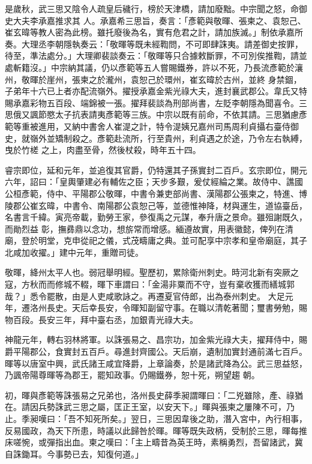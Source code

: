 \begin{pinyinscope}
 是歲秋，武三思又陰令人疏皇后穢行，榜於天津橋，請加廢黜。中宗聞之怒，命御史大夫李承嘉推求其
 人。承嘉希三思旨，奏言：「彥範與敬暉、張柬之、袁恕己、崔玄暐等教人密為此榜。雖托廢後為名，實有危君之計，請加族滅。」制依承嘉所奏。大理丞李朝隱執奏云：「敬暉等既未經鞫問，不可即肆誅夷。請差御史按罪，待至，準法處分。」大理卿裴談奏云：「敬暉等只合據敕斷罪，不可別俟推鞫，請並處斬籍沒。」中宗納其議，仍以彥範等五人嘗賜鐵券，許以不死，乃長流彥範於瀼州，敬暉於崖州，張柬之於瀧州，袁恕己於環州，崔玄暐於古州，並終
 身禁錮，子弟年十六已上者亦配流嶺外。擢授承嘉金紫光祿大夫，進封襄武郡公。韋氏又特賜承嘉彩物五百段、端錦被一張。擢拜裴談為刑部尚書，左貶李朝隱為聞喜令。三思俄又諷節愍太子抗表請夷彥範等三族。中宗以既有前命，不依其請。三思猶慮彥範等重被進用，又納中書舍人崔湜之計，特令湜姨兄嘉州司馬周利貞攝右臺侍御史，就嶺外並矯制殺之。彥範赴流所，行至貴州，利貞遇之於途，乃令左右執縛，曳於竹槎
 之上，肉盡至骨，然後杖殺，時年五十四。



 睿宗即位，延和元年，並追復其官爵，仍特還其子孫實封二百戶。玄宗即位，開元六年，詔曰：「皇輿肇建必有輔佐之臣；天步多艱，爰仗經綸之業。故侍中、譙國公桓彥範，侍中、平陽郡公敬暉，中書令兼吏部尚書、漢陽郡公張柬之，特進、博陵郡公崔玄暐，中書令、南陽郡公袁恕己等，並德惟神降，材與運生，道協臺岳，名書言千緯。寅亮帝載，勤勞王家，參復禹之元謀，奉升唐之景命。雖殂謝既久，而勛烈益
 彰，撫彞鼎以念功，想旂常而增感。緬遵故實，用表徽懿，俾列在清廟，登於明堂，克申從祀之儀，式茂疇庸之典。並可配享中宗孝和皇帝廟庭，其子北咸加收擢。」建中元年，重贈司徒。



 敬暉，絳州太平人也。弱冠舉明經。聖歷初，累除衛州刺史。時河北新有突厥之寇，方秋而而修城不輟，暉下車謂曰：「金湯非粟而不守，豈有棄收獲而繕城郭哉？」悉令罷散，由是人吏咸歌詠之。再遷夏官侍郎，出為泰州刺史。
 大足元年，遷洛州長史。天后幸長安，令暉知副留守事。在職以清乾著聞；璽書勞勉，賜物百段。長安三年，拜中臺右丞，加銀青光祿大夫。



 神龍元年，轉右羽林將軍。以誅張易之、昌宗功，加金紫光祿大夫，擢拜侍中，賜爵平陽郡公，食實封五百戶。尋進封齊國公。天后崩，遺制加實封通前滿七百戶。暉等以唐室中興，武氏諸王咸宜降爵，上章論奏，於是諸武降為公。武三思益怒，乃諷帝陽尊暉等為郡王，罷知政事。仍賜鐵券，恕十死，朔望趨
 朝。



 初，暉與彥範等誅張易之兄弟也，洛州長史薛季昶謂暉曰：「二兇雖除，產、祿猶在。請因兵勢誅武三思之屬，匡正王室，以安天下。」暉與張柬之屢陳不可，乃止。季昶嘆曰：「吾不知死所矣。」翌日，三思因韋後之助，潛入宮中，內行相事，反易國政，為天下所患，時議以此歸咎於暉。暉等既失政柄，受制於三思，暉每推床嗟惋，或彈指出血。柬之嘆曰：「主上疇昔為英王時，素稱勇烈，吾留諸武，冀自誅鋤耳。今事勢已去，知復何道。」




\end{pinyinscope}
